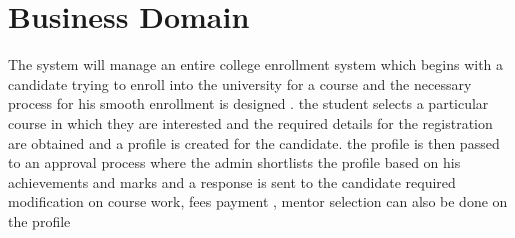 \section{Business Domain}
The system will manage an entire college enrollment system which begins with a candidate trying to enroll into the university for a course and the necessary process for his smooth enrollment is designed .
the student selects a particular course in which they are interested and the required details for the registration are obtained and a profile is created for the candidate.
the profile is then passed to an approval process where the admin shortlists the profile based on his achievements and marks and a response is sent to the candidate
required modification on course work, fees payment , mentor selection can also be done on the profile